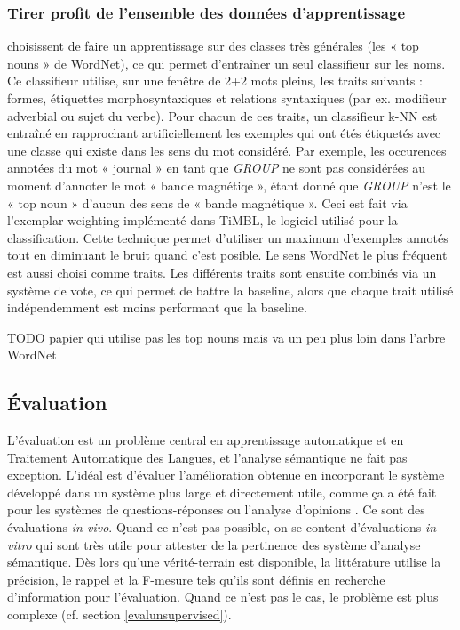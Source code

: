 \subsubsection{Tirer profit de l'ensemble des données d'apprentissage}

\cite{kohomban2005learning} choisissent de faire un apprentissage sur des
classes très générales (les « top nouns » de WordNet), ce qui permet
d'entraîner un seul classifieur sur les noms. Ce classifieur utilise, sur une
fenêtre de 2+2 mots pleins, les traits suivants : formes, étiquettes
morphosyntaxiques et relations syntaxiques (par ex. modifieur adverbial ou
sujet du verbe). Pour chacun de ces traits, un classifieur k-NN est entraîné en
rapprochant artificiellement les exemples qui ont étés étiquetés avec une
classe qui existe dans les sens du mot considéré. Par exemple, les occurences
annotées du mot « journal » en tant que \textit{GROUP} ne sont pas considérées
au moment d'annoter le mot « bande magnétiqe », étant donné que \textit{GROUP}
n'est le « top noun » d'aucun des sens de « bande magnétique ». Ceci est fait
via l'exemplar weighting implémenté dans TiMBL, le logiciel utilisé pour la
classification. Cette technique permet d'utiliser un maximum d'exemples annotés
tout en diminuant le bruit quand c'est posible. Le sens WordNet le plus
fréquent est aussi choisi comme traits. Les différents traits sont ensuite
combinés via un système de vote, ce qui permet de battre la baseline, alors que
chaque trait utilisé indépendemment est moins performant que la baseline.

TODO papier qui utilise pas les top nouns mais va un peu plus loin dans l'arbre WordNet


\subsection{Évaluation}
\label{subsec:evaluation}

L'évaluation est un problème central en apprentissage automatique et en
Traitement Automatique des Langues, et l'analyse sémantique ne fait pas
exception. L'idéal est d'évaluer l'amélioration obtenue en incorporant le
système développé dans un système plus large et directement utile, comme ça a
été fait pour les systèmes de questions-réponses \citep{shen2007using} ou
l'analyse d'opinions \citep{das2012structure}. Ce sont des évaluations
\textit{in vivo}. Quand ce n'est pas possible, on se content d'évaluations
\textit{in vitro} qui sont très utile pour attester de la pertinence des
système d'analyse sémantique. Dès lors qu'une vérité-terrain est disponible, la
littérature utilise la précision, le rappel et la F-mesure tels qu'ils sont
définis en recherche d'information pour l'évaluation. Quand ce n'est pas le
cas, le problème est plus complexe (cf. section \ref{evalunsupervised}).

